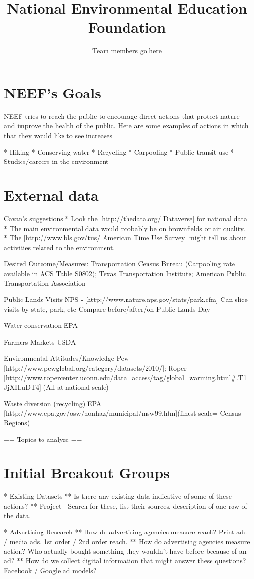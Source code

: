 \documentclass{article}
\title{National Environmental Education Foundation}
\author{Team members go here}
\begin{document}
\section{NEEF's Goals}
NEEF tries to reach the public to encourage direct actions that protect nature and improve the health of the public. Here are some examples of actions in which that they would like to see increases

* Hiking
* Conserving water
* Recycling
* Carpooling
* Public transit use
* Studies/careers in the environment

\section{External data}
Cavan's suggestions
* Look the [http://thedata.org/ Dataverse] for national data
* The main environmental data would probably be on brownfields or air quality.
* The [http://www.bls.gov/tus/ American Time Use Survey] might tell us about activities related to the environment.


Desired Outcome/Measures:
Transportation
Census Bureau (Carpooling rate available in ACS Table S0802); Texas Transportation Institute; American Public Transportation Association
 
Public Lands Visits
 NPS - [http://www.nature.nps.gov/stats/park.cfm]
Can slice visits by state, park, etc
Compare before/after/on Public Lands Day


Water conservation
EPA
 
Farmers Markets
USDA
 
Environmental Attitudes/Knowledge
Pew [http://www.pewglobal.org/category/datasets/2010/]; Roper [http://www.ropercenter.uconn.edu/data_access/tag/global_warming.html#.T1JjXHluDT4] (All at national scale)
 
Waste diversion (recycling)
EPA [http://www.epa.gov/osw/nonhaz/municipal/msw99.htm](finest scale= Census Regions)

== Topics to analyze ==

\section{Initial Breakout Groups}

* Existing Datasets
** Is there any existing data indicative of some of these actions?
** Project - Search for these, list their sources, description of one row of the data.

* Advertising Research
** How do advertising agencies measure reach?  Print ads / media ads.  1st order / 2nd order reach.
** How do advertising agencies measure action?  Who actually bought something they wouldn't have before because of an ad?
** How do we collect digital information that might answer these questions?  Facebook / Google ad models?
\end{document}
